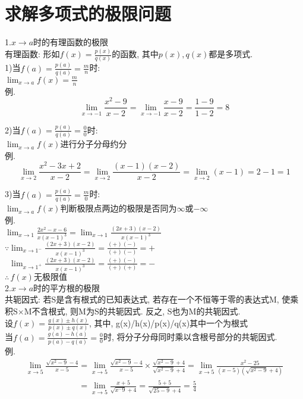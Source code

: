 \chapter{求解多项式的极限问题}
1.$x\to a$时的有理函数的极限\\
有理函数: 形如$f(x)=\frac{p(x)}{q(x)}$的函数, 其中$p(x),q(x)$都是多项式.\\
1)当$f(a)=\frac{p(a)}{q(a)}=\frac{m}{n}$时:\\
$\displaystyle\lim_{x\to a}f(x)=\frac{m}{n}$\\
例.
\[\lim_{x\to -1}\frac{x^2-9}{x-2}=\lim_{x\to -1}\frac{x-9}{x-2}=\frac{1-9}{1-2}=8\]\vspace{1ex}

2)当$\displaystyle f(a)=\frac{p(a)}{q(a)}=\frac{0}{0}$时:\\
$\displaystyle\lim_{x\to a}f(x)$进行分子分母约分\\
例.\\
\[\lim_{x\to 2}\frac{x^2-3x+2}{x-2}=\lim_{x\to 2}\frac{(x-1)(x-2)}{x-2}=\lim_{x\to 2}(x-1)=2-1=1\]\vspace{1ex}

3)当$\displaystyle f(a)=\frac{p(a)}{q(a)}=\frac{m}{0}$时:\\
$\displaystyle\lim_{x\to a}f(x)$判断极限点两边的极限是否同为$\infty$或$-\infty$\\
例.\\
$\displaystyle\lim_{x\to 1}\frac{2x^2-x-6}{x(x-1)^3}=\lim_{x\to 1}\frac{(2x+3)(x-2)}{x(x-1)^3}$\\
$\displaystyle\mathbf{\because}\lim_{x\to 1^-}\frac{(2x+3)(x-2)}{x(x-1)^3}=\frac{(+)(-)}{(+)(-)}=+$\\
$\displaystyle\phantom{\because}\lim_{x\to 1^+}\frac{(2x+3)(x-2)}{x(x-1)^3}=\frac{(+)(-)}{(+)(+)}=-$\\
$\displaystyle\mathbf{\therefore}\,f(x)\text{无极限值}$\\[2ex]

2.$x\to a$时的平方根的极限\\
共轭因式: 若S是含有根式的已知表达式, 若存在一个不恒等于零的表达式M, 使乘积S$\times$M不含根式, 则M为S的共轭因式. 反之, S也为M的共轭因式.\\
设$f(x)=\frac{g(x)\pm h(x)}{p(x)\pm q(x)}$, 其中, g(x)/h(x)/p(x)/q(x)其中一个为根式\\
当$f(a)=\frac{g(a)-h(a)}{p(a)-q(a)}=\frac{0}{0}$时, 将分子分母同时乘以含根号部分的共轭因式.\\
例.
\begin{displaymath}
\begin{array}{l}
    \displaystyle\lim_{x\to 5}\frac{\sqrt{x^2-9}-4}{x-5}=\lim_{x\to 5}\frac{\sqrt{x^2-9}-4}{x-5}\times\frac{\sqrt{x^2-9}+4}{\sqrt{x^2-9}+4}=\lim_{x\to 5}\frac{x^2-25}{(x-5)(\sqrt{x^2-9}+4)}\\
    \displaystyle\phantom{\lim_{x\to 5}\frac{\sqrt{x^2-9}-4}{x-5}}=\lim_{x\to 5}\frac{x+5}{\sqrt{x^-9}+4}=\frac{5+5}{\sqrt{25-9}+4}=\frac{5}{4}
\end{array}
\end{displaymath}\vspace{2ex}

